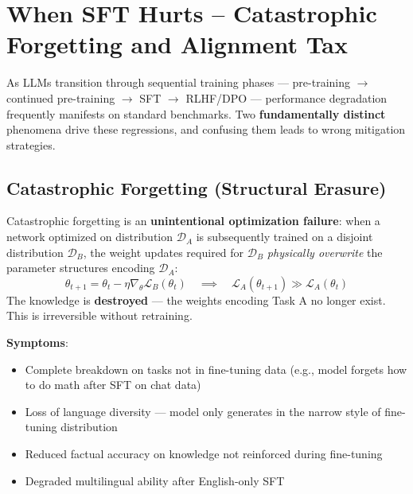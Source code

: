 \section{When SFT Hurts -- Catastrophic Forgetting and Alignment Tax}
\label{sec:sft-pitfalls}

As LLMs transition through sequential training phases --- pre-training $\rightarrow$ continued pre-training $\rightarrow$ SFT $\rightarrow$ RLHF/DPO --- performance degradation frequently manifests on standard benchmarks. Two \textbf{fundamentally distinct} phenomena drive these regressions, and confusing them leads to wrong mitigation strategies.

\subsection{Catastrophic Forgetting (Structural Erasure)}
\label{catastrophic-forgetting-structural-erasure}

\begin{warningbox}
Catastrophic forgetting is an \textbf{unintentional optimization failure}: when a network optimized on distribution $\mathcal{D}_A$ is subsequently trained on a disjoint distribution $\mathcal{D}_B$, the weight updates required for $\mathcal{D}_B$ \emph{physically overwrite} the parameter structures encoding $\mathcal{D}_A$: 
\begin{equation}
\theta_{t+1} = \theta_t - \eta \nabla_\theta \mathcal{L}_B(\theta_t) \quad \implies \quad \mathcal{L}_A(\theta_{t+1}) \gg \mathcal{L}_A(\theta_t)
\end{equation}
 The knowledge is \textbf{destroyed} --- the weights encoding Task A no longer exist. This is irreversible without retraining.
\end{warningbox}

\textbf{Symptoms}:

\begin{itemize}
  \item Complete breakdown on tasks not in fine-tuning data (e.g., model forgets how to do math after SFT on chat data)
  \item Loss of language diversity --- model only generates in the narrow style of fine-tuning distribution
  \item Reduced factual accuracy on knowledge not reinforced during fine-tuning
  \item Degraded multilingual ability after English-only SFT
\end{itemize}

